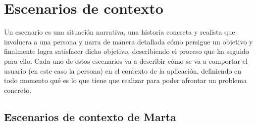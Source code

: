 \section{Escenarios de contexto}
Un escenario es una situación narrativa, una historia concreta y realista que involucra a una persona y narra de manera detallada cómo persigue un objetivo y
finalmente logra satisfacer dicho objetivo, describiendo el proceso que ha seguido para ello. Cada uno de estos escenarios va a describir cómo se va a comportar
el usuario (en este caso la persona) en el contexto de la aplicación, definiendo en todo momento qué es lo que tiene que realizar para poder afrontar un problema
concreto.
\subsection{Escenarios de contexto de Marta}
